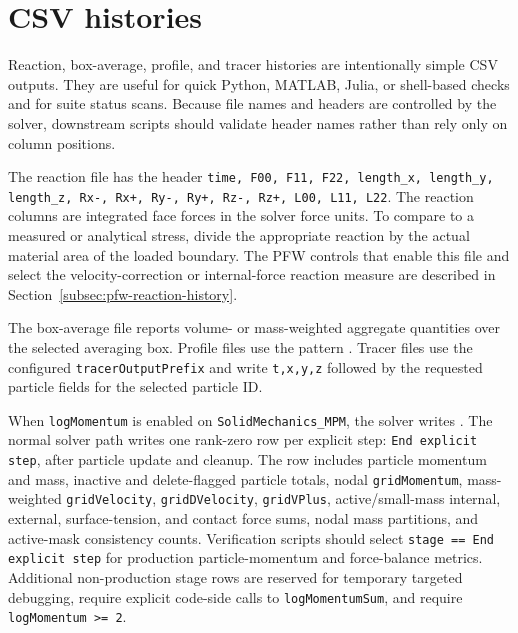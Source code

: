 \section{CSV histories}
\label{sec:csv-histories}
Reaction, box-average, profile, and tracer histories are intentionally simple CSV outputs.  They are useful for quick Python, MATLAB, Julia, or shell-based checks and for suite status scans.  Because file names and headers are controlled by the solver, downstream scripts should validate header names rather than rely only on column positions.

The reaction file  has the header \texttt{time, F00, F11, F22, length\_x, length\_y, length\_z, Rx-, Rx+, Ry-, Ry+, Rz-, Rz+, L00, L11, L22}.  The reaction columns are integrated face forces in the solver force units.  To compare to a measured or analytical stress, divide the appropriate reaction by the actual material area of the loaded boundary.  The PFW controls that enable this file and select the velocity-correction or internal-force reaction measure are described in Section~\ref{subsec:pfw-reaction-history}.

The box-average file  reports volume- or mass-weighted aggregate quantities over the selected averaging box.  Profile files use the pattern .  Tracer files use the configured \texttt{tracerOutputPrefix} and write \texttt{t,x,y,z} followed by the requested particle fields for the selected particle ID.

When \texttt{logMomentum} is enabled on \texttt{SolidMechanics\_MPM}, the solver writes .  The normal solver path writes one rank-zero row per explicit step: \texttt{End explicit step}, after particle update and cleanup.  The row includes particle momentum and mass, inactive and delete-flagged particle totals, nodal \texttt{gridMomentum}, mass-weighted \texttt{gridVelocity}, \texttt{gridDVelocity}, \texttt{gridVPlus}, active/small-mass internal, external, surface-tension, and contact force sums, nodal mass partitions, and active-mask consistency counts.  Verification scripts should select \texttt{stage == End explicit step} for production particle-momentum and force-balance metrics.  Additional non-production stage rows are reserved for temporary targeted debugging, require explicit code-side calls to \texttt{logMomentumSum}, and require \texttt{logMomentum >= 2}.

